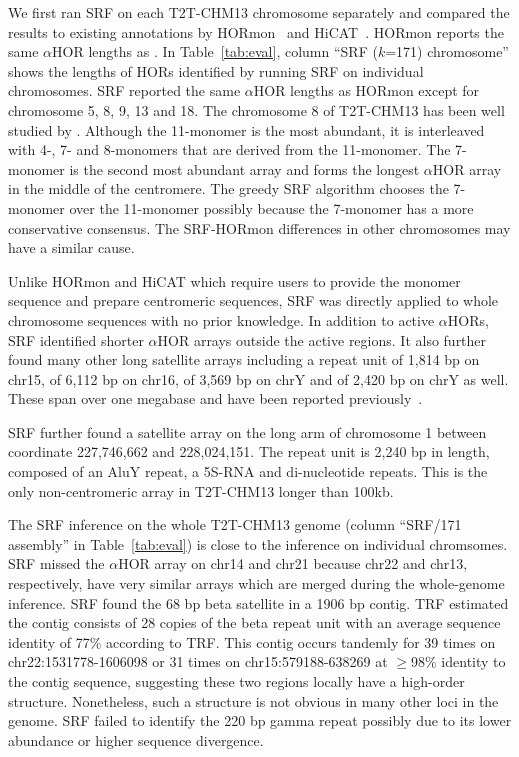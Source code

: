 \documentclass{bioinfo}
\newcommand{\revised}[1]{{\color{blue}#1}}
\begin{document}
We first ran SRF on each T2T-CHM13
chromosome separately and compared the results to existing annotations by
HORmon~\citep{Kunyavskaya:2022tx} and HiCAT~\citep{Gao2022.08.07.502881}.
HORmon reports the same $\alpha$HOR lengths as \citet{Altemose:2022tv}.
In Table~\ref{tab:eval}, column ``SRF ($k$=171) chromosome'' shows the lengths
of HORs identified by running SRF on individual chromosomes.  SRF
reported the same $\alpha$HOR lengths as HORmon except for chromosome 5, 8, 9,
13 and 18. The chromosome 8 of T2T-CHM13 has been well studied by
\citet{Logsdon:2021aa}. Although the 11-monomer is the most abundant, it is
interleaved with 4-, 7- and 8-monomers that are derived from the 11-monomer.
The 7-monomer is the second most abundant array and forms the longest
$\alpha$HOR array in the middle of the centromere. The greedy SRF algorithm
chooses the 7-monomer over the 11-monomer possibly because the 7-monomer
has a more conservative consensus. The SRF-HORmon differences in other
chromosomes may have a similar cause.

Unlike HORmon and HiCAT which require users to provide the monomer
sequence and prepare centromeric sequences, SRF was directly applied to
whole chromosome sequences with no prior knowledge. In addition to active
$\alpha$HORs, SRF identified shorter $\alpha$HOR arrays outside the active
regions. It also further found many other long satellite arrays including a repeat
unit of 1,814 bp on chr15, of 6,112 bp on chr16, of 3,569 bp on chrY and of
2,420 bp on chrY as well. These span over one megabase and have been reported
previously~\citep{Altemose:2022vw}.

SRF further found a satellite array on the long arm of chromosome 1 between
coordinate 227,746,662 and 228,024,151. The repeat unit is 2,240 bp in length,
composed of an AluY repeat, a 5S-RNA and di-nucleotide repeats. This is the
only non-centromeric array in T2T-CHM13 longer than 100kb.

The SRF inference on the whole T2T-CHM13 genome (column ``SRF/171 assembly'' in
Table~\ref{tab:eval}) is close to the inference on individual chromsomes. SRF
missed the $\alpha$HOR array on chr14 and chr21 because chr22 and chr13,
respectively, have very similar arrays which are merged during the whole-genome
inference. \revised{SRF found the 68 bp beta satellite in a 1906 bp contig.
TRF estimated the contig consists of 28 copies of the beta repeat unit with an
average sequence identity of 77\% according to TRF. This contig occurs tandemly for 39 times on
chr22:1531778-1606098 or 31 times on chr15:579188-638269 at $\ge$98\% identity
to the contig sequence, suggesting these two regions locally have a high-order
structure. Nonetheless, such a structure is not obvious in many other loci in
the genome. SRF failed to identify the 220 bp gamma repeat possibly due to its
lower abundance or higher sequence divergence.}
\end{document}
